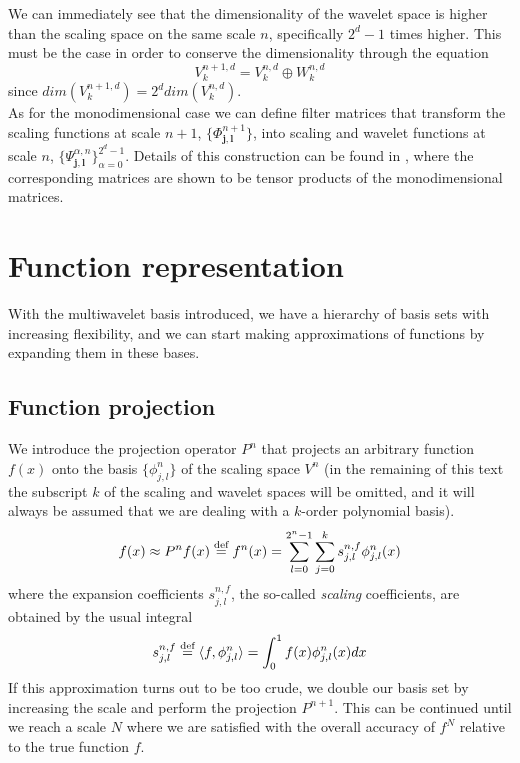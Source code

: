 \noindent
We can immediately see that the dimensionality of the wavelet space is higher
than the scaling space on the same scale $n$, specifically $2^d-1$ times
higher. This must be the case in order to conserve the 
dimensionality through the equation
\begin{equation}
	V^{n+1,d}_k = V^{n,d}_k \oplus W^{n,d}_k
\end{equation}
since $dim(V^{n+1,d}_k) = 2^d dim(V^{n,d}_k)$.\\

\noindent
As for the monodimensional case we can define filter matrices that transform
the scaling functions at scale $n+1$,
$\lbrace\Phi^{n+1}_{\boldsymbol{j},\boldsymbol{l}}\rbrace$, into scaling and 
wavelet functions at scale $n$, $\lbrace\Psi^{\alpha,n}_{\boldsymbol{j},
\boldsymbol{l}}\rbrace_{\alpha=0}^{2^d-1}$. Details of this construction can be
found in \cite{Fossgaard}, where the corresponding matrices are shown to be 
tensor products of the monodimensional matrices. 

\section{Function representation}
With the multiwavelet basis introduced, we have a hierarchy of basis sets with
increasing flexibility, and we can start making approximations of functions by
expanding them in these bases.

\subsection{Function projection}
We introduce the projection operator $P^n$ that projects an arbitrary function 
$f(x)$ onto the basis $\lbrace\phi^n_{j,l}\rbrace$ of the scaling space $V^n$
(in the remaining of this text the subscript $k$ of the scaling and wavelet
spaces will be omitted, and it will always be assumed that we are dealing with
a $k$-order polynomial basis).
\begin{equation}
	\label{eq:funcprojection}
	f(x) \approx P^nf(x) \stackrel{\text{def}}{\hbox{=}} f^n(x) =
		\sum_{l=0}^{2^n-1}\sum_{j=0}^ks^{n,f}_{j,l}\phi^n_{j,l}(x)
\end{equation}
where the expansion coefficients $s^{n,f}_{j,l}$, the so-called \emph{scaling}
coefficients, are obtained by the usual integral
\begin{equation}
	\label{eq:scalingint}
	s^{n,f}_{j,l} \stackrel{\text{def}}{\hbox{=}} \langle f, \phi^n_{j,l}\rangle =
	\int_0^1f(x)\phi^n_{j,l}(x)dx
\end{equation}
If this approximation turns out to be too crude, we double our basis set by
increasing the scale and perform the projection $P^{n+1}$. This can be
continued until we reach a scale $N$ where we are satisfied with the overall
accuracy of $f^N$ relative to the true function $f$.

